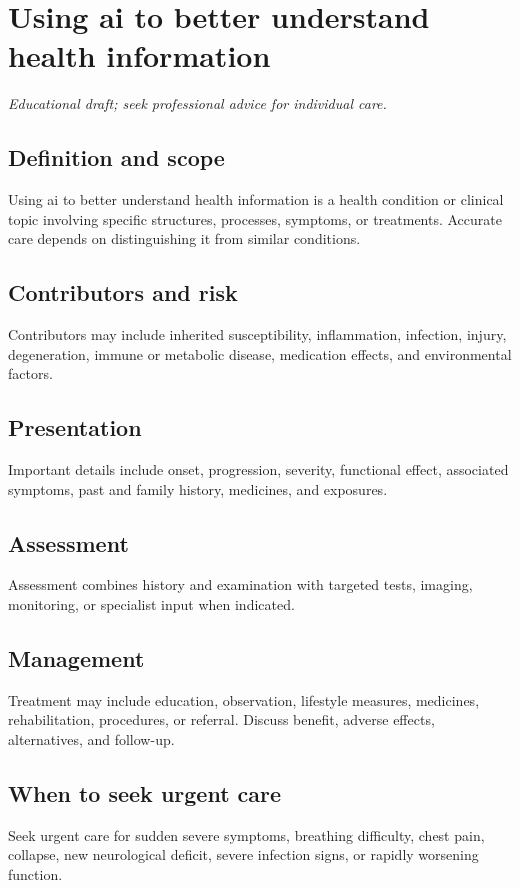 \chapter{Using ai to better understand health information}
\medskip
\noindent\textit{Educational draft; seek professional advice for individual care.}

\section*{Definition and scope}
Using ai to better understand health information is a health condition or clinical topic involving specific structures, processes, symptoms, or treatments. Accurate care depends on distinguishing it from similar conditions.

\section*{Contributors and risk}
Contributors may include inherited susceptibility, inflammation, infection, injury, degeneration, immune or metabolic disease, medication effects, and environmental factors.

\section*{Presentation}
Important details include onset, progression, severity, functional effect, associated symptoms, past and family history, medicines, and exposures.

\section*{Assessment}
Assessment combines history and examination with targeted tests, imaging, monitoring, or specialist input when indicated.

\section*{Management}
Treatment may include education, observation, lifestyle measures, medicines, rehabilitation, procedures, or referral. Discuss benefit, adverse effects, alternatives, and follow-up.

\section*{When to seek urgent care}
Seek urgent care for sudden severe symptoms, breathing difficulty, chest pain, collapse, new neurological deficit, severe infection signs, or rapidly worsening function.

